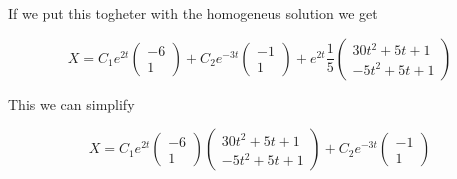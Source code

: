 \documentclass[a4paper]{article}
\begin{document}
If we put this togheter with the homogeneus solution we get

\begin{equation}
    X = C_1 e^{2t} \begin{pmatrix}
        -6 \\
        1
    \end{pmatrix} + C_2 e^{-3t} \begin{pmatrix}
        -1 \\
        1
    \end{pmatrix} + e^{2t}\frac{1}{5} \begin{pmatrix}
        30t^2 + 5t+1 \\
        -5t^2 + 5t+1
    \end{pmatrix}
\end{equation}

This we can simplify

\begin{equation}
    X = C_1 e^{2t} \begin{pmatrix}
        -6 \\
        1
    \end{pmatrix} \begin{pmatrix}
        30t^2 + 5t+1 \\
        -5t^2 + 5t+1
    \end{pmatrix}  + C_2 e^{-3t} \begin{pmatrix}
        -1 \\
        1
    \end{pmatrix}
\end{equation}
\end{document}
